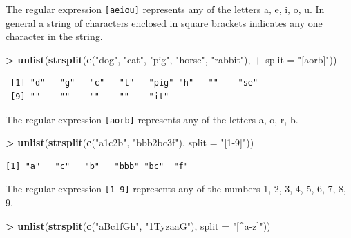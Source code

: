 \documentclass[
]{krantz}
\makeatletter
\newenvironment{Shaded}{\begin{snugshade}}{\end{snugshade}}
\newcommand{\DataTypeTok}[1]{\textcolor[rgb]{0.27,0.27,0.27}{#1}}
\newcommand{\KeywordTok}[1]{\textcolor[rgb]{0.27,0.27,0.27}{\textbf{#1}}}
\newcommand{\NormalTok}[1]{#1}
\newcommand{\OperatorTok}[1]{\textcolor[rgb]{0.43,0.43,0.43}{\textbf{#1}}}
\newcommand{\StringTok}[1]{\textcolor[rgb]{0.5,0.5,0.5}{#1}}
\newenvironment{kframe}{%
\medskip{}
\setlength{\fboxsep}{.8em}
 \def\at@end@of@kframe{}%
 \ifinner\ifhmode%
  \def\at@end@of@kframe{\end{minipage}}%
  \begin{minipage}{\columnwidth}%
 \fi\fi%
 \def\FrameCommand##1{\hskip\@totalleftmargin \hskip-\fboxsep
 \colorbox{shadecolor}{##1}\hskip-\fboxsep
     \hskip-\linewidth \hskip-\@totalleftmargin \hskip\columnwidth}%
 \MakeFramed {\advance\hsize-\width
   \@totalleftmargin\z@ \linewidth\hsize
   \@setminipage}}%
 {\par\unskip\endMakeFramed%
 \at@end@of@kframe}
\renewenvironment{Shaded}{\begin{kframe}}{\end{kframe}}
\makeatother
\begin{document}
The regular expression \texttt{{[}aeiou{]}} represents any of the letters a, e, i, o, u. In general a string of characters enclosed in square brackets indicates any one character in the string.

\begin{Shaded}
\begin{Highlighting}[]
\OperatorTok{\textgreater{}}\StringTok{ }\KeywordTok{unlist}\NormalTok{(}\KeywordTok{strsplit}\NormalTok{(}\KeywordTok{c}\NormalTok{(}\StringTok{"dog"}\NormalTok{, }\StringTok{"cat"}\NormalTok{, }\StringTok{"pig"}\NormalTok{, }\StringTok{"horse"}\NormalTok{, }\StringTok{"rabbit"}\NormalTok{), }
\OperatorTok{+}\StringTok{                 }\DataTypeTok{split =} \StringTok{"[aorb]"}\NormalTok{))}
\end{Highlighting}
\end{Shaded}

\begin{verbatim}
 [1] "d"   "g"   "c"   "t"   "pig" "h"   ""    "se" 
 [9] ""    ""    ""    ""    "it" 
\end{verbatim}

The regular expression \texttt{{[}aorb{]}} represents any of the letters a, o, r, b.

\begin{Shaded}
\begin{Highlighting}[]
\OperatorTok{\textgreater{}}\StringTok{ }\KeywordTok{unlist}\NormalTok{(}\KeywordTok{strsplit}\NormalTok{(}\KeywordTok{c}\NormalTok{(}\StringTok{"a1c2b"}\NormalTok{, }\StringTok{"bbb2bc3f"}\NormalTok{), }\DataTypeTok{split =} \StringTok{"[1{-}9]"}\NormalTok{))}
\end{Highlighting}
\end{Shaded}

\begin{verbatim}
[1] "a"   "c"   "b"   "bbb" "bc"  "f"  
\end{verbatim}

The regular expression \texttt{{[}1-9{]}} represents any of the numbers 1, 2, 3, 4, 5, 6, 7, 8, 9.

\begin{Shaded}
\begin{Highlighting}[]
\OperatorTok{\textgreater{}}\StringTok{ }\KeywordTok{unlist}\NormalTok{(}\KeywordTok{strsplit}\NormalTok{(}\KeywordTok{c}\NormalTok{(}\StringTok{"aBc1fGh"}\NormalTok{, }\StringTok{"1TyzaaG"}\NormalTok{), }\DataTypeTok{split =} \StringTok{"[\^{}a{-}z]"}\NormalTok{))}
\end{Highlighting}
\end{Shaded}
\end{document}
